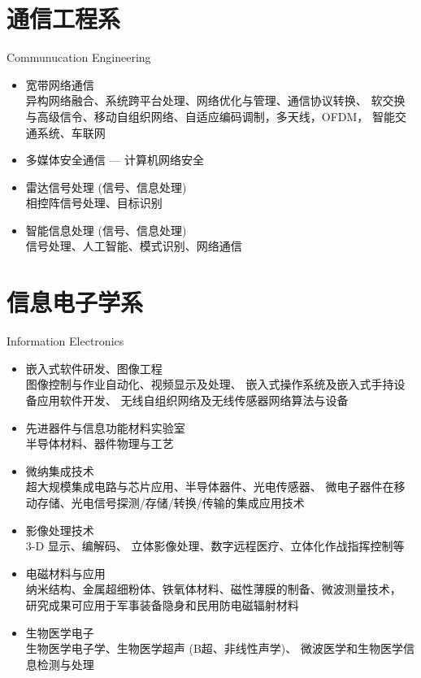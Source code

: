 \documentclass[10pt,t]{beamer}
\begin{document}
\section{通信工程系}
\begin{frame}{Communucation Engineering}
\begin{itemize}
    \item 宽带网络通信\\
        异构网络融合、系统跨平台处理、网络优化与管理、通信协议转换、
        软交换与高级信令、移动自组织网络、自适应编码调制，多天线，OFDM，
        智能交通系统、车联网

    \item 多媒体安全通信 --- 计算机网络安全

    \item 雷达信号处理 (信号、信息处理)\\
        相控阵信号处理、目标识别

    \item 智能信息处理 (信号、信息处理)\\ 
        信号处理、人工智能、模式识别、网络通信
\end{itemize}
\end{frame}

\section{信息电子学系}
\begin{frame}{Information Electronics}
\begin{itemize}
    \item 嵌入式软件研发、图像工程\\
        图像控制与作业自动化、视频显示及处理、
        嵌入式操作系统及嵌入式手持设备应用软件开发、
        无线自组织网络及无线传感器网络算法与设备

    \item 先进器件与信息功能材料实验室\\
        半导体材料、器件物理与工艺

    \item 微纳集成技术\\
        超大规模集成电路与芯片应用、半导体器件、光电传感器、
        微电子器件在移动存储、光电信号探测/存储/转换/传输的集成应用技术

    \item 影像处理技术\\ 
        3-D 显示、编解码、
        立体影像处理、数字远程医疗、立体化作战指挥控制等

    \item 电磁材料与应用\\
        纳米结构、金属超细粉体、铁氧体材料、磁性薄膜的制备、微波测量技术，
        研究成果可应用于军事装备隐身和民用防电磁辐射材料
        
    \item 生物医学电子\\
        生物医学电子学、生物医学超声 (B超、非线性声学)、
        微波医学和生物医学信息检测与处理
\end{itemize}
\end{frame}
\end{document}
